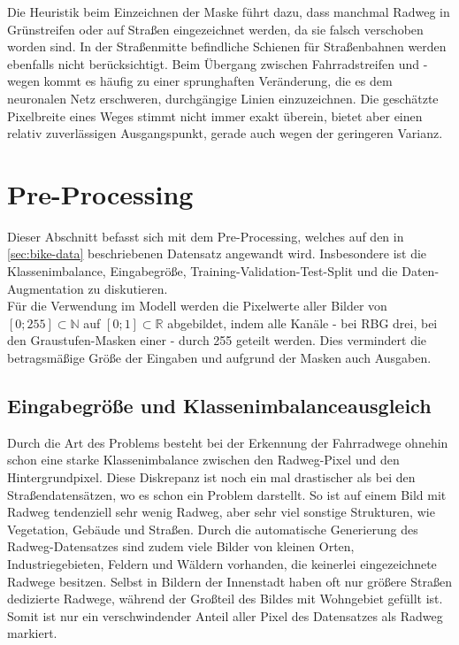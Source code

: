 Die Heuristik beim Einzeichnen der Maske führt dazu, dass manchmal Radweg in Grünstreifen oder auf Straßen eingezeichnet werden, da sie falsch verschoben worden sind.
In der Straßenmitte befindliche Schienen für Straßenbahnen werden ebenfalls nicht berücksichtigt.
Beim Übergang zwischen Fahrradstreifen und -wegen kommt es häufig zu einer sprunghaften Veränderung, die es dem neuronalen Netz erschweren, durchgängige Linien einzuzeichnen.
Die geschätzte Pixelbreite eines Weges stimmt nicht immer exakt überein, bietet aber einen relativ zuverlässigen Ausgangspunkt, gerade auch wegen der geringeren Varianz.


\section{Pre-Processing} \label{sec:pre-processing}

Dieser Abschnitt befasst sich mit dem Pre-Processing, welches auf den in \autoref{sec:bike-data} 
beschriebenen Datensatz angewandt wird. Insbesondere ist die Klassenimbalance, Eingabegröße, 
Training-Validation-Test-Split und die Daten-Augmentation zu diskutieren. \\
Für die Verwendung im Modell werden die Pixelwerte aller Bilder von $[0; 255] \subset \mathbb{N}$
auf $[0;1] \subset \mathbb{R}$ abgebildet, indem alle Kanäle - bei RBG drei, bei den Graustufen-Masken einer - durch 255 geteilt werden.
Dies vermindert die betragsmäßige Größe der Eingaben und aufgrund der Masken auch Ausgaben. 

\subsection{Eingabegröße und Klassenimbalanceausgleich}

Durch die Art des Problems besteht bei der Erkennung der Fahrradwege ohnehin schon eine starke 
Klassenimbalance zwischen den Radweg-Pixel und den Hintergrundpixel. Diese Diskrepanz ist noch ein mal drastischer 
als bei den Straßendatensätzen, wo es schon ein Problem darstellt. So ist auf einem Bild mit Radweg 
tendenziell sehr wenig Radweg, aber sehr viel sonstige Strukturen, wie Vegetation, Gebäude und Straßen. 
Durch die automatische Generierung des Radweg-Datensatzes sind zudem viele Bilder von kleinen Orten,
Industriegebieten, Feldern und Wäldern vorhanden, die keinerlei eingezeichnete Radwege besitzen. 
Selbst in Bildern der Innenstadt haben oft nur größere Straßen dedizierte Radwege, während der 
Großteil des Bildes mit Wohngebiet gefüllt ist. 
Somit ist nur ein verschwindender Anteil aller Pixel des Datensatzes als Radweg markiert. 

